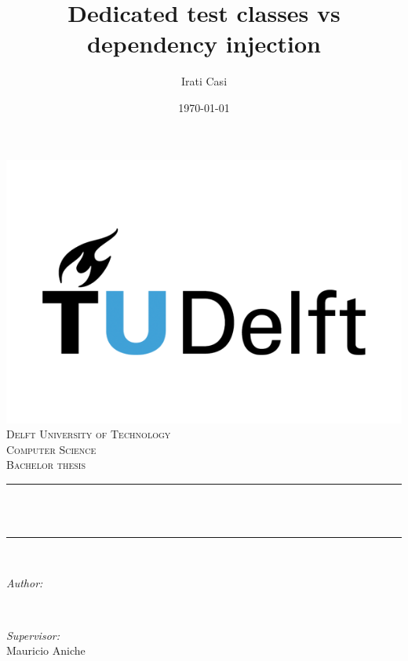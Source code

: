 \documentclass[11pt, a4paper, twocolumn]{article}
\title{Dedicated test classes vs dependency injection}
\author{Irati Casi}
\date{\today}
\makeatletter
\let\thetitle\@title
\let\theauthor\@author
\let\thedate\@date
\makeatother
\begin{document}

\begin{titlepage}
	\centering
    \vspace*{2 cm}
    \includegraphics[scale = 0.25]{tu-delft.png}\\[1.0 cm]
    \textsc{\LARGE Delft University of Technology}\\[2.0 cm]
	\textsc{\Large Computer Science}\\[0.5 cm]
	\textsc{\large Bachelor thesis}\\[0.5 cm]
	\rule{\linewidth}{0.2 mm} \\[0.4 cm]
	{ \huge 
	\bfseries 
	\thetitle}\\
	\rule{\linewidth}{0.2 mm} \\[1.5 cm]
	
	\begin{minipage}{0.4\textwidth}
		\begin{flushleft} \large
			\emph{Author:}\\
			\theauthor
			\end{flushleft}
			\end{minipage}~
			\begin{minipage}{0.4\textwidth}
			\begin{flushright} \large
			\emph{Supervisor:} \\
			Mauricio Aniche	
		\end{flushright}
	\end{minipage}\\[2 cm]
	
	{\large \thedate}\\[2 cm]
 
	\vfill
	
\end{titlepage}
\end{document}
